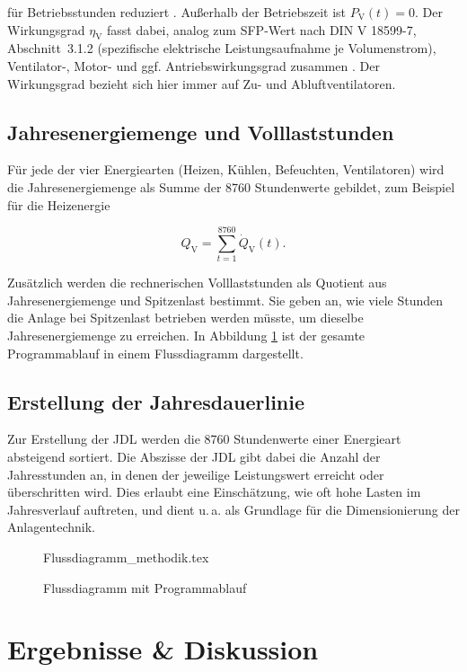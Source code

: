 \documentclass{scrreprt}
\begin{document}
für Betriebsstunden reduziert \parencite{DIN185993}. Außerhalb der
Betriebszeit ist $P_{\mathrm{V}}(t) = 0$. Der Wirkungsgrad
$\eta_{\mathrm{V}}$ fasst dabei, analog zum \ac{SFP}-Wert nach
DIN V 18599-7, Abschnitt~3.1.2 (spezifische elektrische
Leistungsaufnahme je Volumenstrom), Ventilator-, Motor- und ggf.
Antriebswirkungsgrad zusammen \parencite{DIN185997}. Der Wirkungsgrad bezieht sich hier immer auf Zu- und Abluftventilatoren.

\section{Jahresenergiemenge und Volllaststunden}
Für jede der vier Energiearten (Heizen, Kühlen, Befeuchten,
Ventilatoren) wird die Jahresenergiemenge als Summe der 8760
Stundenwerte gebildet, zum Beispiel für die Heizenergie

\begin{equation}
    Q_{\mathrm{V}} = \sum_{t=1}^{8760} \dot Q_{\mathrm{V}}(t).
\end{equation}

Zusätzlich werden die rechnerischen Volllaststunden als Quotient aus
Jahresenergiemenge und Spitzenlast bestimmt. Sie geben an, wie viele
Stunden die Anlage bei Spitzenlast betrieben werden müsste, um
dieselbe Jahresenergiemenge zu erreichen. In Abbildung \ref{abb:Flussdiagramm} ist der gesamte Programmablauf in einem Flussdiagramm dargestellt.

\section{Erstellung der Jahresdauerlinie}
Zur Erstellung der \ac{JDL} werden die 8760 Stundenwerte einer
Energieart absteigend sortiert. Die Abszisse der \ac{JDL} gibt dabei
die Anzahl der Jahresstunden an, in denen der jeweilige Leistungswert
erreicht oder überschritten wird. Dies erlaubt eine Einschätzung, wie
oft hohe Lasten im Jahresverlauf auftreten, und dient u.\,a. als
Grundlage für die Dimensionierung der Anlagentechnik. 

\begin{figure}[H]
\centering
{Flussdiagramm_methodik.tex}
\caption{Flussdiagramm mit Programmablauf}
\label{abb:Flussdiagramm}
\end{figure}

\chapter{Ergebnisse \& Diskussion}\label{chap:Ergebnisse}
\end{document}

